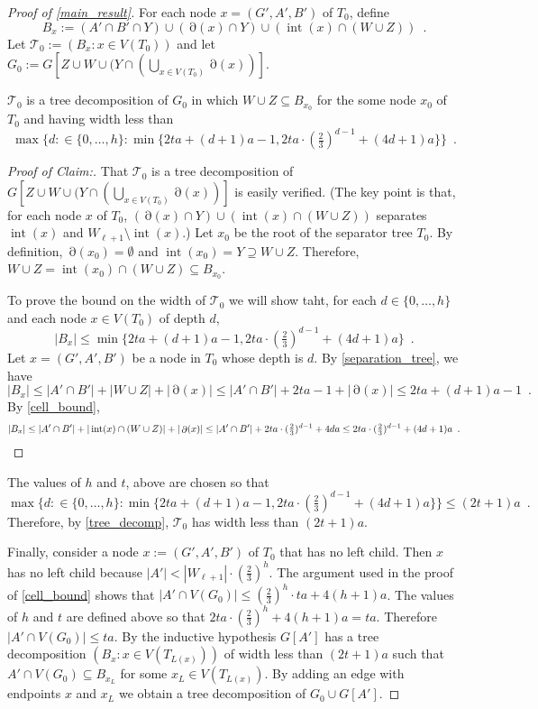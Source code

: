 \documentclass{patmorin}
\newenvironment{clmproof}{\begin{proof}[Proof of Claim:]\renewcommand{\qedsymbol}{\rule{1ex}{1ex}}}{\end{proof}}
\DeclareMathOperator{\interior}{int}
\DeclareMathOperator{\boundary}{\partial}
\begin{document}
\begin{proof}[Proof of \cref{main_result}]
 For each node $x=(G',A',B')$ of $T_0$, define
 \[
    B_x:=(A'\cap B'\cap Y) \cup(\boundary(x)\cap Y)\cup(\interior(x)\cap (W\cup Z)) \enspace .
 \]
 Let $\mathcal{T}_0:=(B_x:x\in V(T_0))$ and let $G_0:=G[Z\cup W\cup (Y\cap (\bigcup_{x\in V(T_0)}\boundary(x))]$.

 \begin{clm}\label{tree_decomp}
     $\mathcal{T}_0$ is a tree decomposition of $G_0$ in which $W\cup Z\subseteq B_{x_0}$ for the some node $x_0$ of $T_0$ and having width less than
     \[
       \max\{d:\in\{0,\ldots,h\}: \min\{2ta+(d+1)a -1, 2ta\cdot (\tfrac{2}{3})^{d-1} + (4d+1)a\} \} \enspace .
     \]
 \end{clm}

 \begin{clmproof}
   That $\mathcal{T}_0$ is a tree decomposition of $G[Z\cup W\cup (Y\cap (\bigcup_{x\in V(T_0)}\boundary(x))]$ is easily verified. (The key point is that, for each node $x$ of $T_0$, $(\boundary(x)\cap Y)\cup(\interior(x)\cap (W\cup Z))$ separates $\interior(x)$ and $W_{\ell+1}\setminus \interior(x)$.)
   Let $x_0$ be the root of the separator tree $T_0$.  By definition, $\boundary(x_0)=\emptyset$ and $\interior(x_0)=Y\supseteq W\cup Z$. Therefore, $W\cup Z=\interior(x_0)\cap (W\cup Z)\subseteq B_{x_0}$.

  To prove the bound on the width of $\mathcal{T}_0$ we will show taht, for each $d\in\{0,\ldots,h\}$ and each node $x\in V(T_0)$ of depth $d$,
  \[
    |B_x|\le \min\{2ta+(d+1)a -1, 2ta\cdot (\tfrac{2}{3})^{d-1} + (4d+1)a\} \enspace .
  \]
   Let $x=(G',A',B')$ be a node in $T_0$ whose depth is $d$.  By \cref{separation_tree}, we have
   \[
    |B_x| \le |A'\cap B'| + |W\cup Z| + |\boundary(x)| \le |A'\cap B'| + 2ta-1 + |\boundary(x)| \le 2ta + (d+1)a - 1 \enspace .
  \]
  By \cref{cell_bound},
  \[
   |B_x| \le |A'\cap B'| + |\interior(x)\cap (W\cup Z)| + |\boundary(x)|
    \le |A'\cap B'| + 2ta  \cdot (\tfrac{2}{3})^{d-1}+4da
   \le 2ta\cdot (\tfrac{2}{3})^{d-1}+(4d+1)a \enspace . \qedhere
   \]
  \end{clmproof}
  The values of $h$ and $t$, above are chosen so that
  \[
    \max\{d:\in\{0,\ldots,h\}: \min\{2ta+(d+1)a -1, 2ta\cdot (\tfrac{2}{3})^{d-1} + (4d+1)a\} \} \le (2t+1)a\enspace .
  \]
  Therefore, by \cref{tree_decomp}, $\mathcal{T}_0$ has width less than $(2t+1)a$.

  Finally, consider a node $x:=(G',A',B')$ of $T_0$ that has no left child.  Then $x$ has no left child because $|A'| < |W_{\ell+1}|\cdot (\tfrac{2}{3})^h$.  The argument used in the proof of \cref{cell_bound} shows that $|A'\cap V(G_0)|\le (\tfrac{2}{3})^{h}\cdot ta + 4(h+1)a$.  The values of $h$ and $t$ are defined above so that $2ta\cdot (\tfrac{2}{3})^{h} + 4(h+1)a=ta$.  Therefore $|A'\cap V(G_0)|\le ta$.  By the inductive hypothesis $G[A']$ has a tree decomposition $(B_x:x\in V(T_{L(x)}))$ of width less than $(2t+1)a$ such that $A'\cap V(G_0) \subseteq B_{x_L}$ for some $x_L\in V(T_{L(x)})$.  By adding an edge with endpoints $x$ and $x_L$ we obtain a tree decomposition of $G_0\cup G[A']$.


\end{proof}
\end{document}
